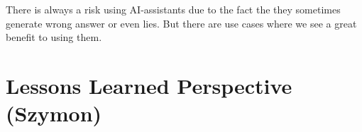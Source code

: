 \documentclass{article}
\begin{document}
There is always a risk using AI-assistants due to the fact the they sometimes generate wrong answer or even lies. But there are use cases where we see a great benefit to using them.

\section{Lessons Learned Perspective (Szymon)}

\end{document}
